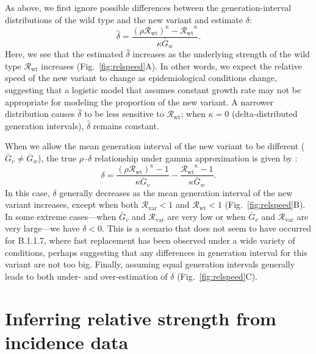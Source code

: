 \documentclass[12pt]{article}
\newcommand{\fref}[1]{Fig.~\ref{fig:#1}}
\newcommand{\vvvar}{\mathrm{var}}
\newcommand{\wwwt}{\mathrm{wt}}
\newcommand{\Rx}[1]{\ensuremath{{\mathcal R}_{#1}}\xspace}
\newcommand{\Rw}{\Rx{\wwwt}}
\newcommand{\Rv}{\Rx{\vvvar}}
\begin{document}
As above, we first ignore possible differences between the generation-interval distributions of the wild type and the new variant and estimate $\delta$:
\begin{equation}
\hat{\delta} = \frac{(\rho \Rw)^{\kappa} - \Rw^{\kappa}}{\kappa \bar{G}_w}.
\end{equation}
Here, we see that the estimated $\hat{\delta}$ increases as the underlying strength of the wild type $\Rw$ increases (\fref{relspeed}A).
In other words, we expect the relative speed of the new variant to change as epidemiological conditions change, suggesting that a logistic model that assumes constant growth rate may not be appropriate for modeling the proportion of the new variant.
A narrower distribution causes $\hat{\delta}$ to be less sensitive to $\Rw$;
when $\kappa = 0$ (delta-distributed generation intervals), $\hat{\delta}$ remains constant.

When we allow the mean generation interval of the new variant to be different ($\bar{G}_v \neq \bar{G}_w$), the true $\rho$--$\delta$ relationship under gamma approximation is given by \citep{park2019practical}:
\begin{equation}
\delta = \frac{(\rho \Rw)^{\kappa} - 1}{\kappa \bar{G}_v} - \frac{\Rw^{\kappa} - 1}{\kappa \bar{G}_w}.
\end{equation}
In this case, $\delta$ generally decreases as the mean generation interval of the new variant increases, except when both $\Rv < 1$ and $\Rw < 1$ (\fref{relspeed}B).
In some extreme cases---when $\bar{G}_v$ and $\Rv$ are very low or when $\bar{G}_v$ and $\Rv$ are very large---we have $\delta < 0$. This is a scenario that does not seem to have occurred for B.1.1.7, where fast replacement has been observed under a wide variety of conditions, perhaps suggesting that any differences in generation interval for this variant are not too big.
Finally, assuming equal generation intervals generally leads to both under- and over-estimation of $\delta$ (\fref{relspeed}C).

\section{Inferring relative strength from incidence data}
\end{document}
